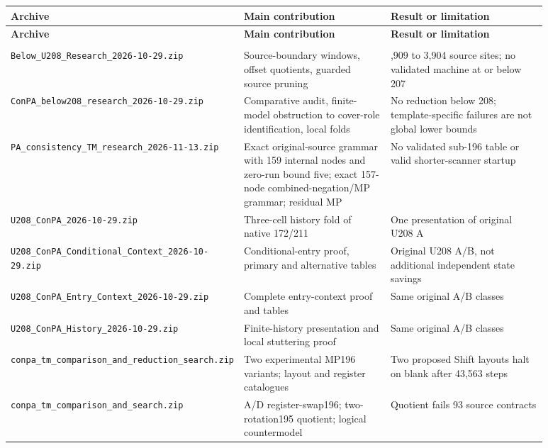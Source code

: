 \begingroup\footnotesize\setlength{\tabcolsep}{3pt}
\renewcommand{\arraystretch}{1.14}
\begin{longtable}{@{}>{\raggedright\arraybackslash}p{0.29\linewidth}>{\raggedright\arraybackslash}p{0.29\linewidth}>{\raggedright\arraybackslash}p{0.3\linewidth}@{}}
\toprule
\textbf{Archive} & \textbf{Main contribution} & \textbf{Result or limitation}\\
\midrule\endfirsthead
\toprule
\textbf{Archive} & \textbf{Main contribution} & \textbf{Result or limitation}\\
\midrule\endhead
\midrule\multicolumn{3}{r}{\emph{Continued on next page}}\\\endfoot
\bottomrule\endlastfoot
\nolinkurl{Below_U208_Research_2026-10-29.zip} & Source-boundary windows, offset quotients, guarded source pruning & 3,909 to 3,904 source sites; no validated machine at or below 207\\
\nolinkurl{ConPA_below208_research_2026-10-29.zip} & Comparative audit, finite-model obstruction to cover-role identification, local folds & No reduction below 208; template-specific failures are not global lower bounds\\
\nolinkurl{PA_consistency_TM_research_2026-11-13.zip} & Exact original-source grammar with 159 internal nodes and zero-run bound five; exact 157-node combined-negation/MP grammar; residual MP & No validated sub-196 table or valid shorter-scanner startup\\
\nolinkurl{U208_ConPA_2026-10-29.zip} & Three-cell history fold of native 172/211 & One presentation of original U208 A\\
\nolinkurl{U208_ConPA_Conditional_Context_2026-10-29.zip} & Conditional-entry proof, primary and alternative tables & Original U208 A/B, not additional independent state savings\\
\nolinkurl{U208_ConPA_Entry_Context_2026-10-29.zip} & Complete entry-context proof and tables & Same original A/B classes\\
\nolinkurl{U208_ConPA_History_2026-10-29.zip} & Finite-history presentation and local stuttering proof & Same original A/B classes\\
\nolinkurl{conpa_tm_comparison_and_reduction_search.zip} & Two experimental MP196 variants; layout and register catalogues & Two proposed Shift layouts halt on blank after 43,563 steps\\
\nolinkurl{conpa_tm_comparison_and_search.zip} & A/D register-swap196; two-rotation195 quotient; logical countermodel & Quotient fails 93 source contracts\\

\end{longtable}
